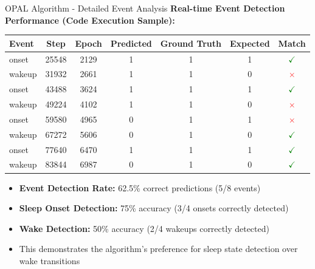 \documentclass[10pt]{beamer} %
\begin{document}
\begin{frame}{OPAL Algorithm - Detailed Event Analysis}
\footnotesize \textbf{Real-time Event Detection Performance (Code Execution Sample):}

\begin{table}[h]
\centering
\tiny
\begin{tabular}{|l|c|c|c|c|c|c|}
\hline
\textbf{Event} & \textbf{Step} & \textbf{Epoch} & \textbf{Predicted} & \textbf{Ground Truth} & \textbf{Expected} & \textbf{Match} \\
\hline
onset & 25548 & 2129 & 1 & 1 & 1 & \textcolor{green}{\textbf{$\checkmark$}} \\
wakeup & 31932 & 2661 & 1 & 1 & 0 & \textcolor{red}{\textbf{$\times$}} \\
onset & 43488 & 3624 & 1 & 1 & 1 & \textcolor{green}{\textbf{$\checkmark$}} \\
wakeup & 49224 & 4102 & 1 & 1 & 0 & \textcolor{red}{\textbf{$\times$}} \\
onset & 59580 & 4965 & 0 & 1 & 1 & \textcolor{red}{\textbf{$\times$}} \\
wakeup & 67272 & 5606 & 0 & 1 & 0 & \textcolor{green}{\textbf{$\checkmark$}} \\
onset & 77640 & 6470 & 1 & 1 & 1 & \textcolor{green}{\textbf{$\checkmark$}} \\
wakeup & 83844 & 6987 & 0 & 1 & 0 & \textcolor{green}{\textbf{$\checkmark$}} \\
\hline
\end{tabular}
\end{table}

\begin{itemize}
  \item \footnotesize \textbf{Event Detection Rate:} 62.5\% correct predictions (5/8 events)
  \item \footnotesize \textbf{Sleep Onset Detection:} 75\% accuracy (3/4 onsets correctly detected)
  \item \footnotesize \textbf{Wake Detection:} 50\% accuracy (2/4 wakeups correctly detected)
  \item \footnotesize This demonstrates the algorithm's preference for sleep state detection over wake transitions
\end{itemize}
\end{frame}
\end{document}
